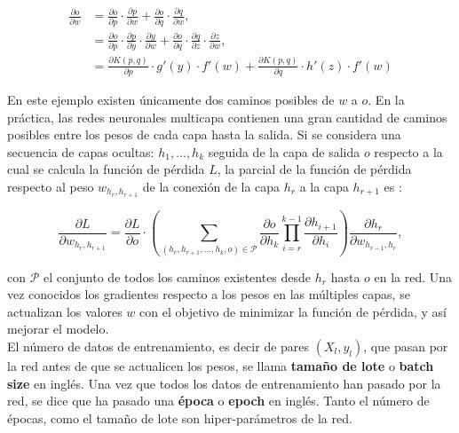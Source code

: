 \begin{align}
  \label{eq:ugly}
\frac{\partial o}{\partial w} &= \frac{\partial o}{\partial p} \cdot \frac{\partial p}{\partial w} +  \frac{\partial o}{\partial q} \cdot \frac{\partial q}{\partial w},  \nonumber \\ 
                              &=  \frac{\partial o}{\partial p}\cdot\frac{\partial p}{\partial y}\cdot\frac{\partial y}{\partial w} + \frac{\partial o}{\partial q}\cdot \frac{\partial q}{\partial z}\cdot \frac{\partial z}{\partial w}, \nonumber \\
                              &= \frac{\partial K(p,q)}{\partial p}\cdot g'(y)\cdot f'(w) + \frac{\partial K(p,q)}{\partial q}\cdot h'(z)\cdot f'(w)
\end{align}

En este ejemplo existen únicamente dos caminos posibles de $w$ a $o$. En la práctica, las redes neuronales multicapa contienen una gran cantidad de caminos posibles entre los pesos de cada capa hasta la salida. Si se considera una secuencia de capas ocultas: $h_1,...,h_k$ seguida de la capa de salida $o$ respecto a la cual se calcula la función de pérdida $L$, la parcial de la función de pérdida respecto al peso $w_{h_r, h_{r+1}}$ de la conexión de la capa $h_{r}$ a la capa $h_{r+1}$ es \cite{Nielsen:2018}:

\begin{equation}
  \label{eq:partialw}
  \frac{\partial L}{\partial w_{h_r, h_{r+1}}} = \frac{\partial L}{\partial o}\cdot \left( \sum_{(h_r,h_{r+1},...,h_k,o)\in \mathcal{P}}\frac{\partial o}{\partial h_k}\prod_{i=r}^{k-1}\frac{\partial h_{i+1}}{\partial h_i}\right) \frac{\partial h_r}{\partial w_{h_{r-1},h_r}},
\end{equation}

\noindent con $\mathcal{P}$ el conjunto de todos los caminos existentes desde $h_r$ hasta $o$ en la red. Una vez conocidos los gradientes respecto a los pesos en las múltiples capas, se actualizan los valores $w$ con el objetivo de minimizar la función de pérdida, y así mejorar el modelo.\\
El número de datos de entrenamiento, es decir de pares $(X_l,y_l)$, que pasan por la red antes de que se actualicen los pesos, se llama \textbf{tamaño de lote} o \textbf{batch size} en inglés. Una vez que todos los datos de entrenamiento han pasado por la red, se dice que ha pasado una \textbf{época} o \textbf{epoch} en inglés. Tanto el número de épocas, como el tamaño de lote son hiper-parámetros de la red.

